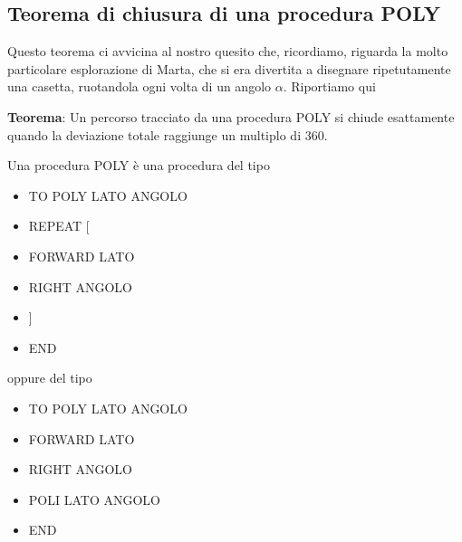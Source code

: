\subsection{Teorema di chiusura di una procedura POLY}
\label{teorema-chiusura}
Questo teorema ci avvicina al nostro quesito che, ricordiamo, riguarda la molto particolare esplorazione di Marta, che si era divertita a disegnare ripetutamente una casetta, ruotandola ogni volta di un angolo $\alpha$. Riportiamo qui 

\textbf{Teorema}: Un percorso tracciato da una procedura POLY si chiude esattamente quando la deviazione totale raggiunge un multiplo di 360\degree.

Una procedura POLY è una procedura del tipo

\vskip 1cm

\begin{minipage}{1.0\textwidth}
\begin{itemize}[itemsep=-3pt,parsep=2pt]
\item[] TO POLY LATO ANGOLO
\item[] \hspace{8pt}    REPEAT [
\item[] \hspace{8pt}\hspace{8pt}       FORWARD LATO
\item[] \hspace{8pt}\hspace{8pt}       RIGHT ANGOLO
\item[] \hspace{8pt}   ]
\item[] END
\end{itemize}          	          
\end{minipage}

\vskip 1cm

oppure del tipo

\vskip 1cm

\begin{minipage}{1.0\textwidth}
\begin{itemize}[itemsep=-3pt,parsep=2pt]
\item[] TO POLY LATO ANGOLO
\item[] \hspace{8pt}       FORWARD LATO
\item[] \hspace{8pt}       RIGHT ANGOLO
\item[] \hspace{8pt} POLI LATO ANGOLO
\item[] END
\end{itemize}          	          
\end{minipage}

